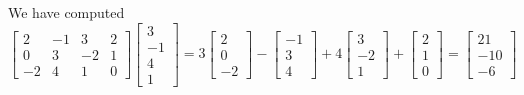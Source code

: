 \documentclass{ximera}
\begin{document}
\begin{exploration}
We have computed 
$$\begin{bmatrix}2&-1&3&2\\0&3&-2&1\\-2&4&1&0\end{bmatrix}\begin{bmatrix}3\\-1\\4\\1\end{bmatrix}=
3\begin{bmatrix}2\\0\\-2\end{bmatrix}
-\begin{bmatrix}-1\\3\\4\end{bmatrix}
+4\begin{bmatrix}3\\-2\\1\end{bmatrix}
+\begin{bmatrix}2\\1\\0\end{bmatrix}
=\begin{bmatrix}21\\-10 \\ -6\end{bmatrix}
$$


\end{exploration}
\end{document}
